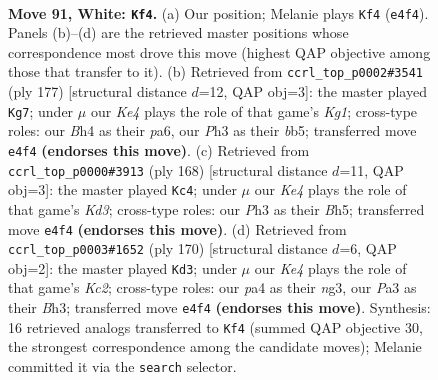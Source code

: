 \documentclass[11pt]{article}
\begin{document}
\clearpage

\begin{figure}[p]\centering
\begin{subfigure}{0.46\textwidth}\centering
\resizebox{\linewidth}{!}{%
\newchessgame
\chessboard[
  setfen={7k/3n4/8/5P2/p3K2B/P6P/8/8 w - - 1 91},
  showmover=false,
  pgfstyle=straightmove, color=movearrow, markmove={e4-f4}
]}
\caption{}
\end{subfigure}\hfill
\begin{subfigure}{0.46\textwidth}\centering
\resizebox{\linewidth}{!}{%
\newchessgame
\chessboard[
  setfen={6k1/5p2/P6p/1Bb4P/8/6K1/8/8 b - - 0 89},
  showmover=false,
  pgfstyle=straightmove, color=movearrow, markmove={g8-g7}
]}
\caption{}
\end{subfigure}
\\[4pt]
\begin{subfigure}{0.46\textwidth}\centering
\resizebox{\linewidth}{!}{%
\newchessgame
\chessboard[
  setfen={5k2/2p5/8/3nP2B/3P4/3K4/8/8 w - - 29 85},
  showmover=false,
  pgfstyle=straightmove, color=movearrow, markmove={d3-c4}
]}
\caption{}
\end{subfigure}\hfill
\begin{subfigure}{0.46\textwidth}\centering
\resizebox{\linewidth}{!}{%
\newchessgame
\chessboard[
  setfen={8/8/3k4/p7/8/2P3nB/P1K5/8 w - - 45 86},
  showmover=false,
  pgfstyle=straightmove, color=movearrow, markmove={c2-d3}
]}
\caption{}
\end{subfigure}
\caption{\textbf{Move 91, White: \texttt{Kf4}.} (a) Our position; Melanie plays \texttt{Kf4} (\texttt{e4f4}). Panels (b)--(d) are the retrieved master positions whose correspondence most drove this move (highest QAP objective among those that transfer to it). (b) Retrieved from \texttt{ccrl\_top\_p0002\#3541} (ply 177) [structural distance $d$=12, QAP obj=3]: the master played \texttt{Kg7}; under $\mu$ our \emph{Ke4} plays the role of that game's \emph{Kg1}; cross-type roles: our \emph{B}h4 as their \emph{p}a6, our \emph{P}h3 as their \emph{b}b5; transferred move \texttt{e4f4} \textbf{(endorses this move)}. (c) Retrieved from \texttt{ccrl\_top\_p0000\#3913} (ply 168) [structural distance $d$=11, QAP obj=3]: the master played \texttt{Kc4}; under $\mu$ our \emph{Ke4} plays the role of that game's \emph{Kd3}; cross-type roles: our \emph{P}h3 as their \emph{B}h5; transferred move \texttt{e4f4} \textbf{(endorses this move)}. (d) Retrieved from \texttt{ccrl\_top\_p0003\#1652} (ply 170) [structural distance $d$=6, QAP obj=2]: the master played \texttt{Kd3}; under $\mu$ our \emph{Ke4} plays the role of that game's \emph{Kc2}; cross-type roles: our \emph{p}a4 as their \emph{n}g3, our \emph{P}a3 as their \emph{B}h3; transferred move \texttt{e4f4} \textbf{(endorses this move)}. Synthesis: 16 retrieved analogs transferred to \texttt{Kf4} (summed QAP objective 30, the strongest correspondence among the candidate moves); Melanie committed it via the \texttt{search} selector.}
\label{fig:thought-m180}
\end{figure}
\end{document}
